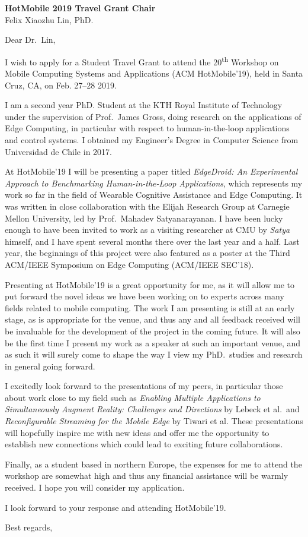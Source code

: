 \documentclass[english, 11pt]{kthletter}
\date{Stockholm, \today}
\begin{document}
\begin{letter}%
  {\textbf{HotMobile 2019 Travel Grant Chair}\\Felix Xiaozhu Lin, PhD.}
\opening{Dear Dr.~Lin,}

I wish to apply for a Student Travel Grant to attend the 20\textsuperscript{th} Workshop on Mobile Computing Systems and Applications (ACM HotMobile'19), held in Santa Cruz, CA, on Feb. 27--28 2019.

I am a second year PhD. Student at the KTH Royal Institute of Technology under the supervision of Prof.\ James Gross, doing research on the applications of Edge Computing, in particular with respect to human-in-the-loop applications and control systems.
I obtained my Engineer's Degree in Computer Science from Universidad de Chile in 2017.

At HotMobile'19 I will be presenting a paper titled \emph{EdgeDroid: An Experimental Approach to Benchmarking Human-in-the-Loop Applications}, which represents my work so far in the field of Wearable Cognitive Assistance and Edge Computing.
It was written in close collaboration with the Elijah Research Group at Carnegie Mellon University, led by Prof.\ Mahadev Satyanarayanan.
I have been lucky enough to have been invited to work as a visiting researcher at CMU by \emph{Satya} himself, and I have spent several months there over the last year and a half.
Last year, the beginnings of this project were also featured as a poster at the Third ACM/IEEE Symposium on Edge Computing (ACM/IEEE SEC'18).

Presenting at HotMobile'19 is a great opportunity for me, as it will allow me to put forward the novel ideas we have been working on to experts across many fields related to mobile computing.
The work I am presenting is still at an early stage, as is appropriate for the venue, and thus any and all feedback received will be invaluable for the development of the project in the coming future. It will also be the first time I present my work as a speaker at such an important venue, and as such it will surely come to shape the way I view my PhD.\ studies and research in general going forward.

I excitedly look forward to the presentations of my peers, in particular those about work close to my field such as \emph{Enabling Multiple Applications to Simultaneously Augment Reality: Challenges and Directions} by Lebeck et al.\ and \emph{Reconfigurable Streaming for the Mobile Edge} by Tiwari et al.
These presentations will hopefully inspire me with new ideas and offer me the opportunity to establish new connections which could lead to exciting future collaborations.

Finally, as a student based in northern Europe, the expenses for me to attend the workshop are somewhat high and thus any financial assistance will be warmly received.
I hope you will consider my application.

I look forward to your response and attending HotMobile'19.

\closing{Best regards,}

\end{letter}
\end{document}
